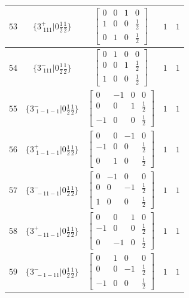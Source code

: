 \documentclass[fleqn,8pt]{jsarticle}
\begin{document}
\begin{longtable}{ccccc}
$ 53 $ & $ \{3^{+}_{\,\,111}|0 \frac{1}{2} \frac{1}{2}\} $ & $ \begin{bmatrix} 0 & 0 & 1 & 0 \\ 1 & 0 & 0 & \frac{1}{2} \\ 0 & 1 & 0 & \frac{1}{2} \end{bmatrix} $ & $ 1 $ & $ 1 $ \\ \hline
$ 54 $ & $ \{3^{-}_{\,\,111}|0 \frac{1}{2} \frac{1}{2}\} $ & $ \begin{bmatrix} 0 & 1 & 0 & 0 \\ 0 & 0 & 1 & \frac{1}{2} \\ 1 & 0 & 0 & \frac{1}{2} \end{bmatrix} $ & $ 1 $ & $ 1 $ \\ \hline
$ 55 $ & $ \{3^{-}_{\,\,1-1-1}|0 \frac{1}{2} \frac{1}{2}\} $ & $ \begin{bmatrix} 0 & -1 & 0 & 0 \\ 0 & 0 & 1 & \frac{1}{2} \\ -1 & 0 & 0 & \frac{1}{2} \end{bmatrix} $ & $ 1 $ & $ 1 $ \\ \hline
$ 56 $ & $ \{3^{+}_{\,\,1-1-1}|0 \frac{1}{2} \frac{1}{2}\} $ & $ \begin{bmatrix} 0 & 0 & -1 & 0 \\ -1 & 0 & 0 & \frac{1}{2} \\ 0 & 1 & 0 & \frac{1}{2} \end{bmatrix} $ & $ 1 $ & $ 1 $ \\ \hline
$ 57 $ & $ \{3^{-}_{\,\,-11-1}|0 \frac{1}{2} \frac{1}{2}\} $ & $ \begin{bmatrix} 0 & -1 & 0 & 0 \\ 0 & 0 & -1 & \frac{1}{2} \\ 1 & 0 & 0 & \frac{1}{2} \end{bmatrix} $ & $ 1 $ & $ 1 $ \\ \hline
$ 58 $ & $ \{3^{+}_{\,\,-11-1}|0 \frac{1}{2} \frac{1}{2}\} $ & $ \begin{bmatrix} 0 & 0 & 1 & 0 \\ -1 & 0 & 0 & \frac{1}{2} \\ 0 & -1 & 0 & \frac{1}{2} \end{bmatrix} $ & $ 1 $ & $ 1 $ \\ \hline
$ 59 $ & $ \{3^{-}_{\,\,-1-11}|0 \frac{1}{2} \frac{1}{2}\} $ & $ \begin{bmatrix} 0 & 1 & 0 & 0 \\ 0 & 0 & -1 & \frac{1}{2} \\ -1 & 0 & 0 & \frac{1}{2} \end{bmatrix} $ & $ 1 $ & $ 1 $ \\ \hline

\end{longtable}
\end{document}
